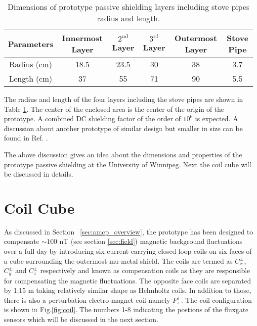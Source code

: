 \begin{table} [!htb]
    \centering
    \begin{tabular} { |c|c|c|c|c|c|} 
        \hline
        Parameters & Innermost Layer & $\mathrm{2^{nd}}$ Layer & $\mathrm{3^{rd}}$ Layer & Outermost Layer & Stove Pipe\\
        \hline\hline
        Radius (cm) & 18.5 & 23.5 & 30 & 38 & 3.7 \\ 
        \hline
        Length (cm) & 37 & 55 & 71 & 90 & 5.5 \\ 
         \hline
    \end{tabular}
    \caption[Dimensions of prototype passive shielding layers]{Dimensions of prototype passive shielding layers including stove pipes radius and length.}\label{table:mu-metal}
\end{table}

The radius and length of the four layers including the stove pipes are shown in Table \ref{table:mu-metal}. The center of the enclosed area is the center of the origin of the prototype. A combined DC shielding factor of the order of $\mathrm{10^6}$ is expected. A discussion about another prototype of similar design but smaller in size can be found in Ref. \cite{baby_shield}.



The above discussion gives an idea about the dimensions and properties of the prototype passive shielding at the University of Winnipeg. Next the coil cube will be discussed in details.

\section{Coil Cube}\label{sec:cube}


As discussed in Section ~\ref{sec:amcp_overview}, the prototype has been designed to compensate $\sim 100$ nT (see section \ref{sec:field}) magnetic background fluctuations over a full day by introducing six current carrying closed loop coils on six faces of a cube surrounding the outermost mu-metal shield. The coils are termed as $C_x^\pm$, $C_y^\pm$ and $C_z^\pm$ respectively and known as compensation coils as they are responsible for compensating the magnetic fluctuations. The opposite face coils are separated by 1.15 m taking relatively similar shape as  Helmholtz coils. In addition to those, there is also a perturbation electro-magnet coil namely $P_z^+$. The coil configuration is shown in Fig.\ref{fig:coil}. The numbers 1-8 indicating the postions of the fluxgate sensors which will be discussed in the next section.



